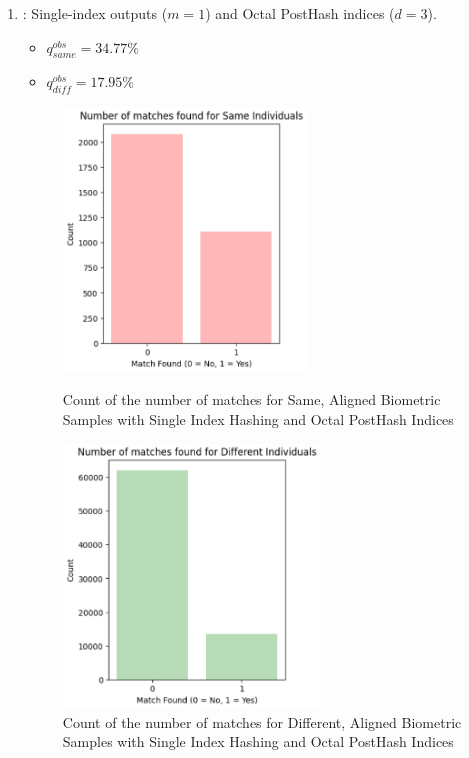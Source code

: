 \begin{enumerate}
    \item {}: Single-index outputs (\(m=1\)) and Octal PostHash indices (\(d=3\)).
    \begin{itemize}
        \item \(q_{same}^{obs} = 34.77\%\)
        \item \(q_{diff}^{obs} = 17.95\%\)
    \end{itemize}

    \begin{figure}[H]
        \centering
        \begin{minipage}[b]{0.48\linewidth}
            \centering
            \includegraphics[width=\linewidth,height=7cm,keepaspectratio]{latex-img/d3same.png}
            \caption{Count of the number of matches for Same, Aligned Biometric Samples with Single Index Hashing and Octal PostHash Indices}
            \label{mu_same}
        \end{minipage}
        \hfill
        \begin{minipage}[b]{0.48\linewidth}
            \centering
            \includegraphics[width=\linewidth,height=7cm,keepaspectratio]{latex-img/d3diff.png}
            \caption{Count of the number of matches for Different, Aligned Biometric Samples with Single Index Hashing and Octal PostHash Indices}
            \label{mu_diff}
        \end{minipage}
    \end{figure}
    

\end{enumerate}
